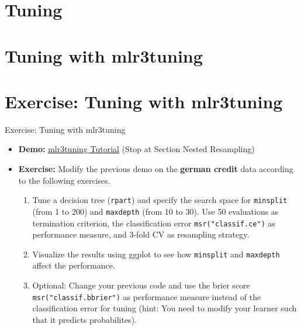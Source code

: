 \documentclass[11pt,compress]{beamer}
\begin{document}
\section{Tuning} %




\section{Tuning with mlr3tuning} %


\section{Exercise: Tuning with mlr3tuning}
\begin{frame}{Exercise: Tuning with mlr3tuning}
\begin{itemize}
\item \textbf{Demo:} \newline\href{https://mlr3gallery.mlr-org.com/posts/2020-03-11-mlr3tuning-tutorial-german-credit/}{\underline{mlr3tuning Tutorial}} (Stop at Section Nested Resampling)
\item \textbf{Exercise:} Modify the previous demo on the \textbf{german credit} data according to the following exercises.
\begin{enumerate}
\item Tune a decision tree (\texttt{rpart}) and specify the search space for \texttt{minsplit} (from 1 to 200) and \texttt{maxdepth} (from 10 to 30). Use 50 evaluations as termination criterion, the classification error \texttt{msr("classif.ce")} as performance measure, and 3-fold CV as resampling strategy.
\item Visualize the results using ggplot to see how \texttt{minsplit} and \texttt{maxdepth} affect the performance.
\item Optional: Change your previous code and use the brier score \texttt{msr("classif.bbrier")} as performance measure instead of the classification error for tuning (hint: You need to modify your learner such that it predicts probabilites).
\end{enumerate}
\end{itemize}
\end{frame}
\end{document}
